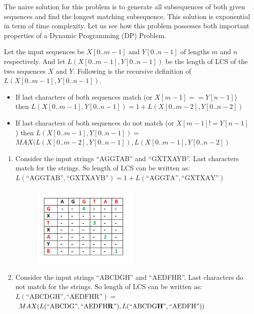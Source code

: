 \RayNotesEnd


The naive solution for this problem is to generate all subsequences of both
given sequences and find the longest matching subsequence. This solution is
exponential in term of time complexity. Let us see how this problem
possesses both important properties of a Dynamic Programming (DP) Problem.


Let the input sequences be $X[0..m-1]$ and $Y[0..n-1]$ of lengths $m$ and
$n$ respectively. And let $L(X[0..m-1],Y[0..n-1])$ be the length of LCS of
the two sequences $X$ and $Y$. Following is the recursive definition of
$L(X[0..m-1],Y[0..n-1])$.
\begin{itemize}%
\item If last characters of both sequences match (or $X[m-1]==Y[n-1]$) then
  $L(X[0..m-1],Y[0..n-1])=1+L(X[0..m-2],Y[0..n-2])$
\item If last characters of both sequences do not match (or
  $X[m-1]!=Y[n-1]$) then $L(X[0..m-1],Y[0..n-1])=$\\
  $MAX(L(X[0..m-2],Y[0..n-1]),L(X[0..m-1],Y[0..n-2])$
\end{itemize}


\begin{enumerate}[label=\textbf{\arabic*.}]
\item Consider the input strings ``AGGTAB'' and ``GXTXAYB''. Last characters
match for the strings. So length of LCS can be written as:\\
$L(\text{``AGGTAB''},\text{``GXTXAYB''}) = 1 +
L(\text{``AGGTA''},\text{``GXTXAY''})$
\begin{figure}
\centering
\includegraphics[width=0.5\textwidth]{Images/figGFGDPSet4LCS}
\label{figGFGDPSet4LCS}
\end{figure}
\item Consider the input strings ``ABCDGH'' and ``AEDFHR''. Last characters
  do not match for the strings. So length of LCS can be written as:\\
$L(\text{``ABCDGH''},\text{``AEDFHR''})=$\\
$MAX(L(\text{``ABCDG''},\text{``AEDFH\textbf{R}''}),L(\text{``ABCDG\textbf{H}''},\text{``AEDFH''}))$
\end{enumerate}

